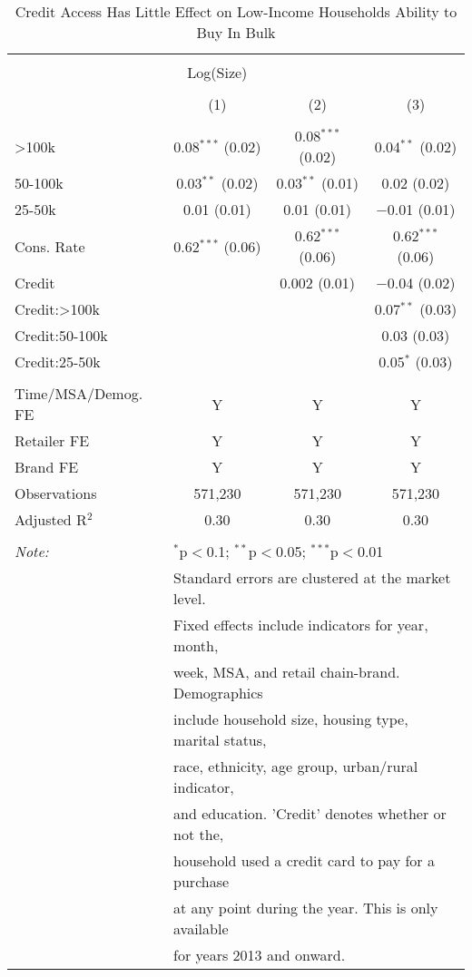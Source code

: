 
\begin{table}[!htbp] \centering 
  \caption{Credit Access Has Little Effect on Low-Income Households Ability to Buy In Bulk} 
  \label{tab:packageSizeFullTpLiq} 
\begin{tabular}{@{\extracolsep{5pt}}lccc} 
\\[-1.8ex]\hline 
\hline \\[-1.8ex] 
 & Log(Size) &  &  \\ 
\\[-1.8ex] & (1) & (2) & (3)\\ 
\hline \\[-1.8ex] 
 >100k & 0.08$^{***}$ (0.02) & 0.08$^{***}$ (0.02) & 0.04$^{**}$ (0.02) \\ 
  50-100k & 0.03$^{**}$ (0.02) & 0.03$^{**}$ (0.01) & 0.02 (0.02) \\ 
  25-50k & 0.01 (0.01) & 0.01 (0.01) & $-$0.01 (0.01) \\ 
  Cons. Rate & 0.62$^{***}$ (0.06) & 0.62$^{***}$ (0.06) & 0.62$^{***}$ (0.06) \\ 
  Credit &  & 0.002 (0.01) & $-$0.04 (0.02) \\ 
  Credit:>100k &  &  & 0.07$^{**}$ (0.03) \\ 
  Credit:50-100k &  &  & 0.03 (0.03) \\ 
  Credit:25-50k &  &  & 0.05$^{*}$ (0.03) \\ 
 \hline \\[-1.8ex] 
Time/MSA/Demog. FE & Y & Y & Y \\ 
Retailer FE & Y & Y & Y \\ 
Brand FE & Y & Y & Y \\ 
Observations & 571,230 & 571,230 & 571,230 \\ 
Adjusted R$^{2}$ & 0.30 & 0.30 & 0.30 \\ 
\hline 
\hline \\[-1.8ex] 
\textit{Note:}  & \multicolumn{3}{l}{$^{*}$p$<$0.1; $^{**}$p$<$0.05; $^{***}$p$<$0.01} \\ 
 & \multicolumn{3}{l}{Standard errors are clustered at the market level.} \\ 
 & \multicolumn{3}{l}{Fixed effects include indicators for year, month, } \\ 
 & \multicolumn{3}{l}{week, MSA, and retail chain-brand. Demographics } \\ 
 & \multicolumn{3}{l}{include household size, housing type, marital status, } \\ 
 & \multicolumn{3}{l}{race, ethnicity, age group, urban/rural indicator, } \\ 
 & \multicolumn{3}{l}{and education. 'Credit' denotes whether or not the,} \\ 
 & \multicolumn{3}{l}{household used a credit card to pay for a purchase } \\ 
 & \multicolumn{3}{l}{at any point during the year. This is only available } \\ 
 & \multicolumn{3}{l}{for years 2013 and onward.} \\ 
\end{tabular} 
\end{table} 
